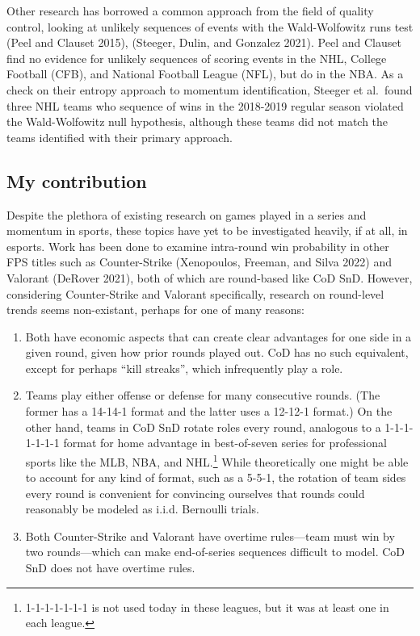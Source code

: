 \documentclass{article}
\providecommand{\tightlist}{%
  \setlength{\itemsep}{0pt}\setlength{\parskip}{0pt}}
\begin{document}
Other research has borrowed a common approach from the field of quality
control, looking at unlikely sequences of events with the Wald-Wolfowitz
runs test (Peel and Clauset 2015), (Steeger, Dulin, and Gonzalez 2021).
Peel and Clauset find no evidence for unlikely sequences of scoring
events in the NHL, College Football (CFB), and National Football League
(NFL), but do in the NBA. As a check on their entropy approach to
momentum identification, Steeger et al.~found three NHL teams who
sequence of wins in the 2018-2019 regular season violated the
Wald-Wolfowitz null hypothesis, although these teams did not match the
teams identified with their primary approach.

\hypertarget{my-contribution}{%
\subsection{My contribution}\label{my-contribution}}

Despite the plethora of existing research on games played in a series
and momentum in sports, these topics have yet to be investigated
heavily, if at all, in esports. Work has been done to examine
intra-round win probability in other FPS titles such as Counter-Strike
(Xenopoulos, Freeman, and Silva 2022) and Valorant (DeRover 2021), both
of which are round-based like CoD SnD. However, considering
Counter-Strike and Valorant specifically, research on round-level trends
seems non-existant, perhaps for one of many reasons:

\begin{enumerate}
\def\labelenumi{\arabic{enumi}.}
\tightlist
\item
  Both have economic aspects that can create clear advantages for one
  side in a given round, given how prior rounds played out. CoD has no
  such equivalent, except for perhaps ``kill streaks'', which
  infrequently play a role.
\item
  Teams play either offense or defense for many consecutive rounds. (The
  former has a 14-14-1 format and the latter uses a 12-12-1 format.) On
  the other hand, teams in CoD SnD rotate roles every round, analogous
  to a 1-1-1-1-1-1-1 format for home advantage in best-of-seven series
  for professional sports like the MLB, NBA, and NHL.\footnote{1-1-1-1-1-1-1
    is not used today in these leagues, but it was at least one in each
    league.} While theoretically one might be able to account for any
  kind of format, such as a 5-5-1, the rotation of team sides every
  round is convenient for convincing ourselves that rounds could
  reasonably be modeled as i.i.d. Bernoulli trials.
\item
  Both Counter-Strike and Valorant have overtime rules---team must win
  by two rounds---which can make end-of-series sequences difficult to
  model. CoD SnD does not have overtime rules.
\end{enumerate}
\end{document}
